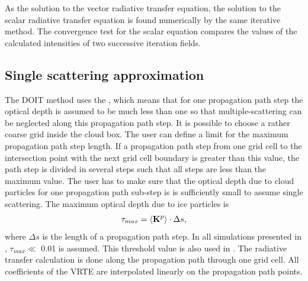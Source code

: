 As the solution to the vector radiative transfer equation, the solution
to the scalar radiative transfer equation is found numerically by the
same iterative method.  The convergence test for the scalar equation
compares the values of the calculated intensities of two successive
iteration fields.

\subsection{Single scattering approximation}
\label{sec:scattering:ss_approx}

The DOIT method uses the ,
which means 
that for one propagation path step the optical depth is assumed to be
much less than one so that multiple-scattering can be neglected along
this propagation path step. It is possible to choose a rather
coarse grid inside the cloud box. The user can define a limit
for the maximum propagation path step length. If a propagation path step from one
grid cell to the intersection point with the next grid cell boundary
is greater than this value, the path step is divided in several steps such
that all steps are less than the maximum value. The user has to make
sure that the optical depth due to cloud particles for one propagation
path sub-step is is sufficiently small to assume
single scattering. The maximum optical depth due to ice particles is 
\begin{equation}
  \tau_{max} = \left\langle {\bf K}^p \right\rangle \cdot \Delta s,
\end{equation}
where $\Delta s$ is the length of a propagation  path step. In all
simulations presented in \citet{emde05:_phdthesis}, $\tau_{max} \ll$ 0.01 is
assumed. This threshold value is also used in \citet{czekala99:_microw}.
The radiative transfer calculation
is done along the propagation path through one grid cell.  All
coefficients of the VRTE are interpolated linearly on the propagation
path points.

\section{}\label{chap:numerical_methods}
\label{sec:scattering:sequential_update}

